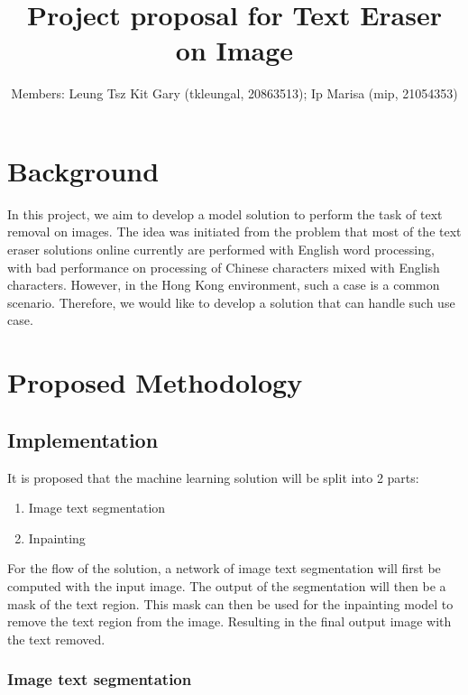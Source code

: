 \documentclass[10pt,twocolumn,letterpaper]{article}
\begin{document}
\title{Project proposal for Text Eraser on Image}

\author{
Members: Leung Tsz Kit Gary (tkleungal, 20863513);  %
Ip Marisa (mip, 21054353)
}
\maketitle

\section{Background}

In this project, we aim to develop a model solution to perform the task of text removal on images. 
The idea was initiated from the problem that most of the text eraser solutions online currently are performed with English word processing, 
with bad performance on processing of Chinese characters mixed with English characters. 
However, in the Hong Kong environment, such a case is a common scenario. Therefore, we would like to develop a solution that can handle such use case.

\section{Proposed Methodology}

\subsection{Implementation}

It is proposed that the machine learning solution will be split into 2 parts:
\begin{enumerate}
    \item Image text segmentation
    \item Inpainting
\end{enumerate}

For the flow of the solution, a network of image text segmentation will first be computed with the input image.
The output of the segmentation will then be a mask of the text region.
This mask can then be used for the inpainting model to remove the text region from the image.
Resulting in the final output image with the text removed.

\subsubsection{Image text segmentation}
\end{document}
